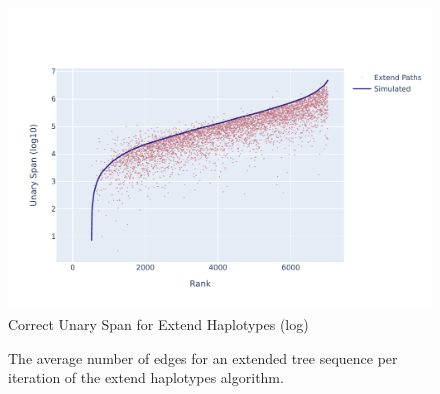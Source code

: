 \documentclass[10pt,twoside,lineno]{gsajnl}
\begin{document}
\begin{figure}[bht]
	\includegraphics[width=0.9\linewidth]{newplots_wo_ee/better_unary_spans_ep_log.pdf}
	\caption{Correct Unary Span for Extend Haplotypes (log)}
	\label{fig:correct-unary-span-log}
\end{figure}

\begin{figure}
	\caption{The average number of edges for an extended tree sequence per iteration of the extend haplotypes algorithm.}
	\label{fig:edges-per-iteration}
\end{figure}



%
\end{document}
